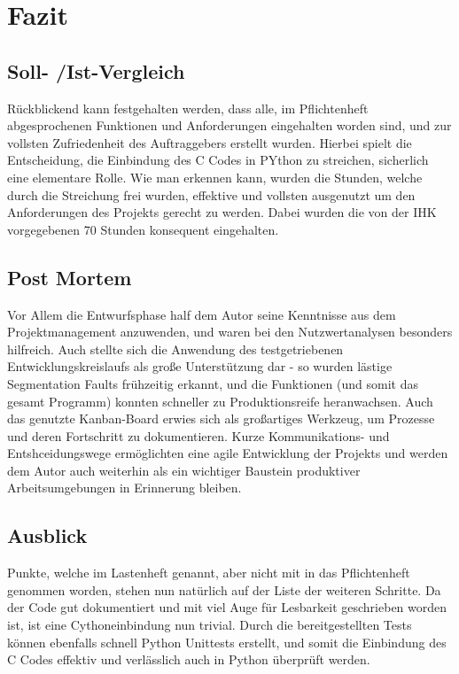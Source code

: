 \section{Fazit}

\subsection{Soll- /Ist-Vergleich}
Rückblickend kann festgehalten werden, dass alle, im Pflichtenheft
abgesprochenen Funktionen und Anforderungen eingehalten worden sind,
und zur vollsten Zufriedenheit des Auftraggebers erstellt wurden. Hierbei
spielt die Entscheidung, die Einbindung des C Codes in PYthon zu streichen, sicherlich
eine elementare Rolle. Wie man erkennen kann, wurden die Stunden, welche durch
die Streichung frei wurden, effektive und vollsten ausgenutzt um den Anforderungen
des Projekts gerecht zu werden. Dabei wurden die von der IHK vorgegebenen 70 Stunden
konsequent eingehalten.

\subsection{Post Mortem}

Vor Allem die Entwurfsphase half dem Autor seine Kenntnisse aus dem Projektmanagement anzuwenden,
und waren bei den Nutzwertanalysen besonders hilfreich. Auch stellte sich die Anwendung des
testgetriebenen Entwicklungskreislaufs als große Unterstützung dar - so wurden lästige Segmentation Faults frühzeitig
erkannt, und die Funktionen (und somit das gesamt Programm) konnten schneller zu Produktionsreife heranwachsen.
Auch das genutzte Kanban-Board erwies sich als großartiges Werkzeug, um Prozesse und deren Fortschritt zu dokumentieren.
Kurze Kommunikations- und Entshceidungswege ermöglichten eine agile Entwicklung der Projekts und werden
dem Autor auch weiterhin als ein wichtiger Baustein produktiver Arbeitsumgebungen in Erinnerung bleiben.

\subsection{Ausblick}
Punkte, welche im Lastenheft genannt, aber nicht mit in das Pflichtenheft genommen worden,
stehen nun natürlich auf der Liste der weiteren Schritte. Da der Code gut dokumentiert
und mit viel Auge für Lesbarkeit geschrieben worden ist, ist eine Cythoneinbindung nun trivial.
Durch die bereitgestellten Tests können ebenfalls schnell Python Unittests erstellt, und somit
die Einbindung des C Codes effektiv und verlässlich auch in Python überprüft werden.

